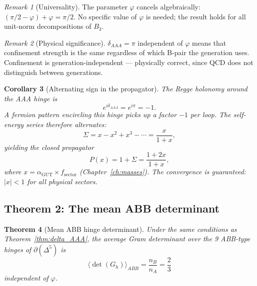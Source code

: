 \documentclass[12pt]{article}
\newtheorem{theorem}{Theorem}[section]
\newtheorem{corollary}[theorem]{Corollary}
\theoremstyle{remark}
\newtheorem{remark}[theorem]{Remark}
\theoremstyle{definition}
\newcommand{\agut}{\alpha_{\mathrm{GUT}}}
\begin{document}
\begin{remark}[Universality]
The parameter $\varphi$ cancels algebraically: $(\pi/2 - \varphi) + \varphi = \pi/2$.  No specific value of $\varphi$ is needed; the result holds for all unit-norm decompositions of $B_3$.
\end{remark}

\begin{remark}[Physical significance]
$\delta_{AAA} = \pi$ independent of $\varphi$ means that confinement strength is the same regardless of which B-pair the generation uses.  Confinement is generation-independent --- physically correct, since QCD does not distinguish between generations.
\end{remark}

\begin{corollary}[Alternating sign in the propagator]
\label{cor:alternating}
The Regge holonomy around the AAA hinge is
\begin{equation}
e^{i\delta_{AAA}} = e^{i\pi} = -1.
\end{equation}
A fermion pattern encircling this hinge picks up a factor $-1$ per
loop.  The self-energy series therefore alternates:
\begin{equation}
\Sigma = x - x^2 + x^3 - \cdots = \frac{x}{1+x},
\end{equation}
yielding the closed propagator
\begin{equation}
P(x) = 1 + \Sigma = \frac{1 + 2x}{1 + x},
\end{equation}
where $x = \agut \times f_{\text{sector}}$ (Chapter~\ref{ch:masses}).
The convergence is guaranteed: $|x| < 1$ for all physical sectors.
\end{corollary}

\subsection{Theorem 2: The mean ABB determinant}
\label{sec:thm_ABB}

\begin{theorem}[Mean ABB hinge determinant]\label{thm:det_ABB}
Under the same conditions as Theorem~\ref{thm:delta_AAA},
the average Gram determinant over the 9 ABB-type hinges of
$\partial(\Delta^5)$ is
\begin{equation}
\boxed{\bigl\langle \det(G_h) \bigr\rangle_{ABB} = \frac{n_B}{n_A}
= \frac{2}{3}}
\end{equation}
independent of $\varphi$.
\end{theorem}
\end{document}
